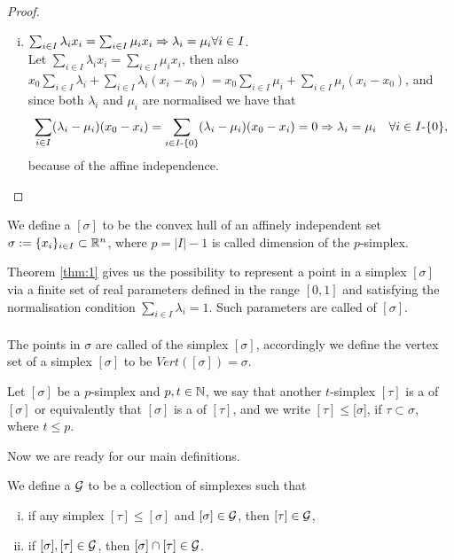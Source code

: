 \documentclass[../1.tex]{subfiles}
\begin{document}
\begin{proof}
\begin{enumerate}[(i)]
            \item $\sum_{i \in I} \lambda_i x_i = \sum_{i \in I} \mu_i x_i \Rightarrow \lambda_i = \mu_i \forall i \in I$.\\
            Let $\sum_{i \in I} \lambda_i x_i = \sum_{i \in I} \mu_i x_i$, then also $x_0\sum_{i \in I} \lambda_i + \sum_{i \in I} \lambda_i(x_i-x_0) = 
            x_0\sum_{i \in I} \mu_i +\sum_{i \in I} \mu_i (x_i - x_0)$, and since both $\lambda_i$ and $\mu_i$ are normalised we have that
            \[ \sum_{i \in I} (\lambda_i - \mu_i) (x_0 - x_i) = \sum_{i \in I \text{-} \{0\}} (\lambda_i - \mu_i) (x_0 - x_i) = 0 \Rightarrow \lambda_i = \mu_i \quad \forall i \in I \text{-} \{0\},\]
            because of the affine independence. \qedhere
        \end{enumerate}
    \end{proof}
  
    \begin{defn}
        We define a  $[\sigma]$ to be the convex hull of an affinely independent set $\sigma := \{x_i\}_{i \in I} \subset \mathbb{R}^n$,
        where $p = |I|-1$ is called dimension of the $p$-simplex. 
    \end{defn}

    Theorem \ref{thm:1} gives us the possibility to represent a point in a simplex $[\sigma]$ via a finite set of real parameters defined in the range $[0,1]$
    and satisfying the normalisation condition $\sum_{i \in I } \lambda_i = 1$. Such parameters are called  of $[\sigma]$.\\
    \hfill \\
    The points in $\sigma$ are called  of the simplex $[\sigma]$, accordingly we define the vertex set of a simplex $[\sigma]$ to be 
    $Vert([\sigma]) = \sigma$.
    
    \begin{defn}
        Let $[\sigma]$ be a $p$-simplex and $p,t \in \mathbb{N}$, we say that another $t$-simplex $[\tau]$ is a  of $[\sigma]$ or equivalently 
        that $[\sigma]$ is a  of $[\tau]$, and we write $[\tau] \leq [\sigma$], if $\tau \subset \sigma$, where $t \leq p$.
    \end{defn}

    Now we are ready for our main definitions.
    
    \begin{defn}
        We define a  $\mathcal{G}$ to be a collection of simplexes such that
        \begin{enumerate}[(i)]
            \item if any simplex $ [\tau] \leq [\sigma]$ and $[\sigma] \in \mathcal{G}$, then $ [\tau] \in \mathcal{G}$,
            \item if $ [\sigma], [\tau] \in \mathcal{G}$, then $[\sigma] \cap [\tau] \in \mathcal{G}$.
        \end{enumerate}
    \end{defn}
\end{document}
